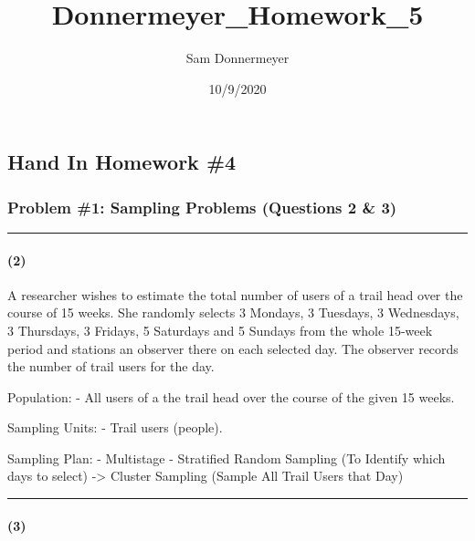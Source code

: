 \documentclass[]{article}
\title{Donnermeyer\_Homework\_5}
\author{Sam Donnermeyer}
\date{10/9/2020}
\let\oldparagraph\paragraph
\renewcommand{\paragraph}[1]{\oldparagraph{#1}\mbox{}}
\begin{document}
\maketitle

\hypertarget{hand-in-homework-4}{%
\subsection{Hand In Homework \#4}\label{hand-in-homework-4}}

\hypertarget{problem-1-sampling-problems-questions-2-3}{%
\subsubsection{Problem \#1: Sampling Problems (Questions 2 \&
3)}\label{problem-1-sampling-problems-questions-2-3}}

\begin{center}\rule{0.5\linewidth}{0.5pt}\end{center}

\hypertarget{section}{%
\paragraph{\texorpdfstring{\textbf{(2)}}{(2)}}\label{section}}

A researcher wishes to estimate the total number of users of a trail
head over the course of 15 weeks. She randomly selects 3 Mondays, 3
Tuesdays, 3 Wednesdays, 3 Thursdays, 3 Fridays, 5 Saturdays and 5
Sundays from the whole 15-week period and stations an observer there on
each selected day. The observer records the number of trail users for
the day.

Population: - All users of a the trail head over the course of the given
15 weeks.

Sampling Units: - Trail users (people).

Sampling Plan: - Multistage - Stratified Random Sampling (To Identify
which days to select) -\textgreater{} Cluster Sampling (Sample All Trail
Users that Day)

\begin{center}\rule{0.5\linewidth}{0.5pt}\end{center}

\hypertarget{section-1}{%
\paragraph{\texorpdfstring{\textbf{(3)}}{(3)}}\label{section-1}}
\end{document}
